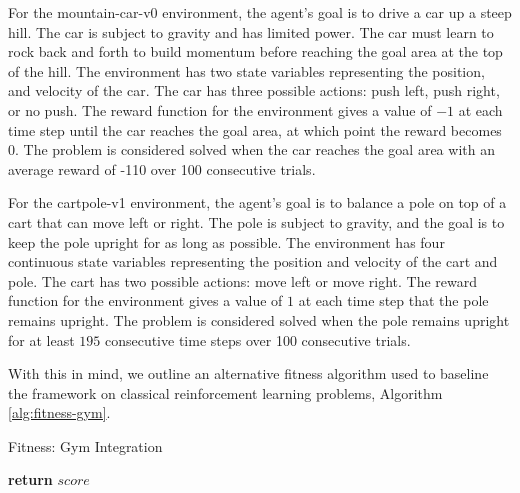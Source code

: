 \documentclass[12pt, final]{dalcsthesis}
\begin{document}
For the mountain-car-v0 environment, the agent's goal is to drive a car up a steep hill. The car is subject to gravity and has limited power. The car must learn to rock back and forth to build momentum before reaching the goal area at the top of the hill. The environment has two state variables representing the position, and velocity of the car. The car has three possible actions: push left, push right, or no push. The reward function for the environment gives a value of $-1$ at each time step until the car reaches the goal area, at which point the reward becomes $0$. The problem is considered solved when the car reaches the goal area with an average reward of -110 over 100 consecutive trials.

For the cartpole-v1 environment, the agent's goal is to balance a pole on top of a cart that can move left or right. The pole is subject to gravity, and the goal is to keep the pole upright for as long as possible. The environment has four continuous state variables representing the position and velocity of the cart and pole. The cart has two possible actions: move left or move right. The reward function for the environment gives a value of $1$ at each time step that the pole remains upright. The problem is considered solved when the pole remains upright for at least $195$ consecutive time steps over 100 consecutive trials.

With this in mind, we outline an alternative fitness algorithm used to baseline the framework on classical reinforcement learning problems, Algorithm \ref{alg:fitness-gym}.

\begin{algorithm}[hb]
	\caption{Fitness: Gym Integration}
	\label{alg:fitness-gym}
	\begin{algorithmic}[1]
		\EndFor
		\State \textbf{return} $score$
	\end{algorithmic}
\end{algorithm}
\end{document}
